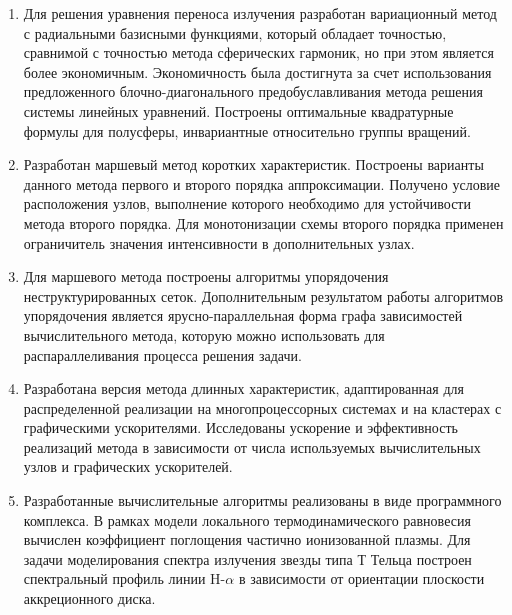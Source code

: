 \begin{enumerate}
  \item Для решения уравнения переноса излучения разработан вариационный метод с радиальными базисными функциями, который обладает точностью, сравнимой с точностью метода сферических гармоник, но при этом является более экономичным. Экономичность была достигнута за счет использования
  предложенного блочно-диагонального предобуславливания метода решения системы линейных уравнений. 
  Построены оптимальные квадратурные формулы для полусферы, инвариантные относительно группы вращений.
  \item Разработан маршевый метод коротких характеристик. Построены варианты данного метода первого и второго порядка аппроксимации. Получено условие расположения узлов, выполнение которого необходимо для устойчивости метода второго порядка. Для монотонизации схемы второго порядка применен ограничитель значения интенсивности в дополнительных узлах.
  \item Для маршевого метода построены алгоритмы упорядочения неструктурированных сеток. Дополнительным результатом работы алгоритмов упорядочения является ярусно-параллельная форма графа зависимостей вычислительного метода, которую можно использовать для распараллеливания процесса решения задачи. 
  \item Разработана версия метода длинных характеристик, адаптированная для распределенной реализации на многопроцессорных системах и на кластерах с графическими ускорителями. Исследованы ускорение и эффективность реализаций метода в зависимости от числа используемых вычислительных узлов и графических ускорителей.
  \item Разработанные вычислительные алгоритмы реализованы в виде программного комплекса. В рамках модели локального термодинамического равновесия вычислен коэффициент поглощения частично ионизованной плазмы. Для задачи моделирования спектра излучения звезды типа Т Тельца построен спектральный профиль линии H-$\alpha$ в зависимости от ориентации плоскости аккреционного диска.
\end{enumerate}
